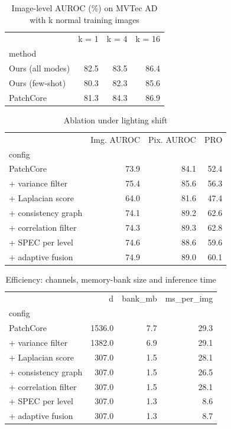 \begin{table}
\caption{Image-level AUROC (\%) on MVTec AD with k normal training images}
\label{tab:fewshot}
\begin{tabular}{lrrr}
\toprule
 & k = 1 & k = 4 & k = 16 \\
method &  &  &  \\
\midrule
Ours (all modes) & 82.5 & 83.5 & 86.4 \\
Ours (few-shot) & 80.3 & 82.3 & 85.6 \\
PatchCore & 81.3 & 84.3 & 86.9 \\
\bottomrule
\end{tabular}
\end{table}


\begin{table}
\caption{Ablation under lighting shift}
\label{tab:ablation}
\begin{tabular}{lrrr}
\toprule
 & Img. AUROC & Pix. AUROC & PRO \\
config &  &  &  \\
\midrule
PatchCore & 73.9 & 84.1 & 52.4 \\
+ variance filter & 75.4 & 85.6 & 56.3 \\
+ Laplacian score & 64.0 & 81.6 & 47.4 \\
+ consistency graph & 74.1 & 89.2 & 62.6 \\
+ correlation filter & 74.3 & 89.3 & 62.8 \\
+ SPEC per level & 74.6 & 88.6 & 59.6 \\
+ adaptive fusion & 74.9 & 89.0 & 60.1 \\
\bottomrule
\end{tabular}
\end{table}


\begin{table}
\caption{Efficiency: channels, memory-bank size and inference time}
\label{tab:efficiency}
\begin{tabular}{lrrr}
\toprule
 & d & bank\_mb & ms\_per\_img \\
config &  &  &  \\
\midrule
PatchCore & 1536.0 & 7.7 & 29.3 \\
+ variance filter & 1382.0 & 6.9 & 29.1 \\
+ Laplacian score & 307.0 & 1.5 & 28.1 \\
+ consistency graph & 307.0 & 1.5 & 26.5 \\
+ correlation filter & 307.0 & 1.5 & 28.1 \\
+ SPEC per level & 307.0 & 1.3 & 8.6 \\
+ adaptive fusion & 307.0 & 1.3 & 8.7 \\
\bottomrule
\end{tabular}
\end{table}
